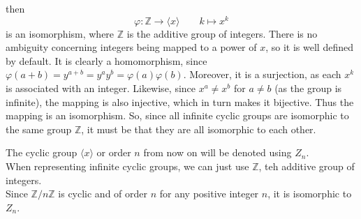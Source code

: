 \documentclass[12pt]{article}
\newcommand{\Z}{\mathbb{Z}}
\newcommand{\ang}[1]{\langle #1 \rangle}
\begin{document}
\begin{itemize}[label=$\diamond$]
            then
            \[ \varphi: \Z \to \ang{x} \qquad k \mapsto x^k \]  
            is an isomorphism,
            where $\Z$ is the additive group of integers.
            There is no ambiguity concerning integers being mapped
            to a power of $x$, so it is well defined by default.
            It is clearly a homomorphism,
            since $\varphi(a+b) = y^{a+b} = y^ay^b = \varphi(a)\varphi(b)$.
            Moreover, it is a surjection,
            as each $x^k$ is associated with an integer.
            Likewise,
            since $x^a \neq x^b$ for $a \neq b$
            (as the group is infinite),
            the mapping is also injective,
            which in turn makes it bijective.
            Thus the mapping is an isomorphism. 
            So, since all infinite cyclic groups are isomorphic
            to the same group $\Z$,
            it must be that they are all isomorphic to each other.
    \end{itemize}

    The cyclic group $\ang{x}$ or order $n$
    from now on will be denoted using $Z_n$. \\
    When representing infinite cyclic groups,
    we can just use $\Z$, teh additive group of integers. \\

    Since $\Z/n\Z$ is cyclic and of order $n$
    for any positive integer $n$,
    it is isomorphic to $Z_n$. \\
\end{document}

